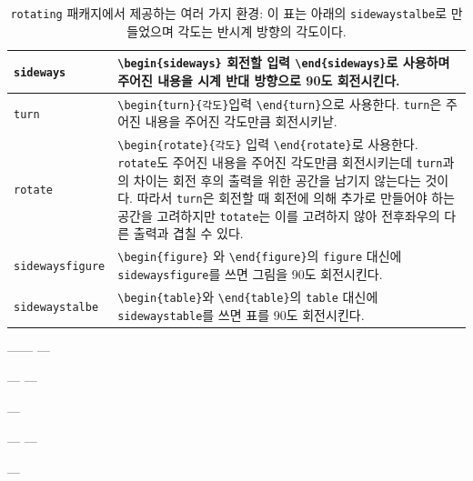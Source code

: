 \documentclass[11pt]{article}
\begin{document}
\begin{table}
\caption[\texttt{rotating} 패키지에서 제공하는 환경]
{\texttt{rotating} 패캐지에서 제공하는 여러 가지 환경: 이 표는 아래의 \texttt{sidewaystalbe}로 만들었으며 각도는 반시계 방향의 각도이다.
\label{tab:sidewaystalbe}}
\begin{center}
\begin{tabular}{|l||p{5in}|} \hline
\texttt{sideways} & \verb|\begin{sideways}| 회전할 입력 \verb|\end{sideways}|로 사용하며 주어진 내용을 시계 반대 방향으로 90도 회전시킨다. \\ \hline
\texttt{turn} & \verb|\begin{turn}{각도}|입력 \verb|\end{turn}|으로 사용한다. \texttt{turn}은 주어진 내용을 주어진 각도만큼 회전시키낟. \\ \hline
\texttt{rotate} & \verb|\begin{rotate}{각도}| 입력 \verb|\end{rotate}|로 사용한다. \texttt{rotate}도 주어진 내용을 주어진 각도만큼 회전시키는데 \texttt{turn}과의 차이는 회전 후의 출력을 위한 공간을 남기지 않는다는 것이다. 따라서 \texttt{turn}은 회전할 때 회전에 의해 추가로 만들어야 하는 공간을 고려하지만 \texttt{totate}는 이를 고려하지 않아 전후좌우의 다른 출력과 겹칠 수 있다. \\ \hline
\texttt{sidewaysfigure} & \verb|\begin{figure}| 와 \verb|\end{figure}|의 \texttt{figure} 대신에 \texttt{sidewaysfigure}를 쓰면 그림을 90도 회전시킨다. \\ \hline
\texttt{sidewaystalbe} & \verb|\begin{table}|와 \verb|\end{table}|의 \texttt{table} 대신에 \texttt{sidewaystable}를 쓰면 표를 90도 회전시킨다. \\ \hline
\end{tabular}
\end{center}
\end{table}

\begin{center}
------
---\begin{turn}{30}
\end{turn}---
---\begin{rotate}{30}
---\end{rotate}---
---\begin{sideways}
\end{sideways}---
\end{center}
\end{document}

